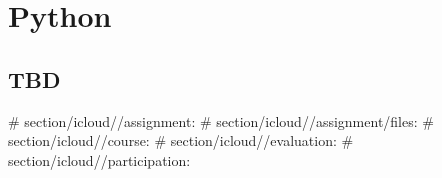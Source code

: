 

\part{Python}

\FILENAME


\chapter{TBD}



# section/icloud//assignment:
# section/icloud//assignment/files:
# section/icloud//course:
# section/icloud//evaluation:
# section/icloud//participation:








